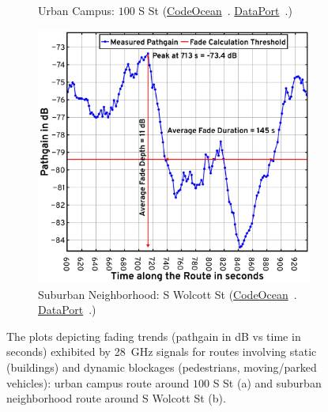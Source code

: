\documentclass[10pt, twocolumn]{IEEEtran}
\begin{document}
{\begin{figure} [t]
\begin{subfigure}{0.5\linewidth}
        \caption{Urban Campus: $100$ S St (\href{https://codeocean.com/capsule/9545863/tree}{CodeOcean}~\cite{CodeOcean}. \href{http://ieee-dataport.org/12580}{DataPort}~\cite{DataPort}.)}
        \label{F10a}
    \end{subfigure}
    \begin{subfigure}{0.49\linewidth}
        \centering
        \includegraphics[width=0.95\linewidth]{figs/suburban_pathgain_vs_time_annotated.pdf}
        \caption{Suburban Neighborhood: S Wolcott St (\href{https://codeocean.com/capsule/9545863/tree}{CodeOcean}~\cite{CodeOcean}. \href{http://ieee-dataport.org/12580}{DataPort}~\cite{DataPort}.)}
        \label{F10b}
    \end{subfigure}
    \vspace{-5mm}
    \caption{The plots depicting fading trends (pathgain in dB vs time in seconds) exhibited by \SI{28}{\giga\hertz} signals for routes involving static (buildings) and dynamic blockages (pedestrians, moving/parked vehicles): urban campus route around $100$ S St (a) and suburban neighborhood route around S Wolcott St (b).}
    \vspace{-4.093mm}
    \label{F10}
\end{figure}
}
\end{document}

